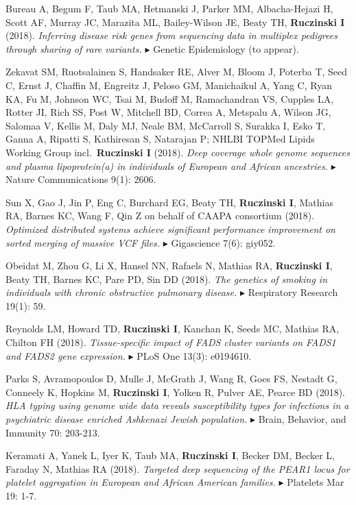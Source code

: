 \documentclass[10pt]{article}
\newcommand{\mine}{
  \addtocounter{enumi}{1}
\item[\fcolorbox{white}{grey}{\color{white} \tiny \arabic{enumi}}]
}
\newcommand{\dg}[1]{{\color{black} $\blacktriangleright$ {#1}}}
\begin{document}
\mine 
Bureau A, Begum F, Taub MA, Hetmanski J, Parker MM, Albacha-Hejazi H, Scott AF, Murray JC, Marazita ML, Bailey-Wilson JE, Beaty TH, {\bf Ruczinski I} (2018).
{\it Inferring disease risk genes from sequencing data in multiplex pedigrees through sharing of rare variants.}
\dg{Genetic Epidemiology (to appear).}
\item
Zekavat SM, Ruotsalainen S, Handsaker RE, Alver M, Bloom J, Poterba T, Seed C, Ernst J, Chaffin M, Engreitz J, Peloso GM, Manichaikul A, Yang C, Ryan KA, Fu M, Johnson WC, Tsai M, Budoff M, Ramachandran VS, Cupples LA, Rotter JI, Rich SS, Post W, Mitchell BD, Correa A, Metspalu A, Wilson JG, Salomaa V, Kellis M, Daly MJ, Neale BM, McCarroll S, Surakka I, Esko T, Ganna A, Ripatti S, Kathiresan S, Natarajan P; NHLBI TOPMed Lipids Working Group incl.~{\bf Ruczinski I} (2018).
{\it Deep coverage whole genome sequences and plasma lipoprotein(a) in individuals of European and African ancestries.}
\dg{Nature Communications 9(1): 2606.}
\item
Sun X, Gao J, Jin P, Eng C, Burchard EG, Beaty TH, {\bf Ruczinski I}, Mathias RA, Barnes KC, Wang F, Qin Z on behalf of CAAPA consortium (2018).
{\it Optimized distributed systems achieve significant performance improvement on sorted merging of massive VCF files.}
\dg{Gigascience 7(6): giy052.}
\item 
Obeidat M, Zhou G, Li X, Hansel NN, Rafaels N, Mathias RA, {\bf Ruczinski I}, Beaty TH, Barnes KC, Pare PD, Sin DD (2018).
{\it The genetics of smoking in individuals with chronic obstructive pulmonary disease.}
\dg{Respiratory Research 19(1): 59.}
\item 
Reynolds LM, Howard TD, {\bf Ruczinski I}, Kanchan K, Seeds MC, Mathias RA, Chilton FH (2018).
{\it Tissue-specific impact of FADS cluster variants on FADS1 and FADS2 gene expression.}
\dg{PLoS One 13(3): e0194610.}
\item 
Parks S, Avramopoulos D, Mulle J, McGrath J, Wang R, Goes FS, Nestadt G, Conneely K, Hopkins M, {\bf Ruczinski I}, Yolken R, Pulver AE, Pearce BD (2018).
{\it HLA typing using genome wide data reveals susceptibility types for infections in a psychiatric disease enriched Ashkenazi Jewish population.}
\dg{Brain, Behavior, and Immunity 70: 203-213.}
\item 
Keramati A, Yanek L, Iyer K, Taub MA, {\bf Ruczinski I}, Becker DM, Becker L, Faraday N, Mathias RA (2018).
{\it Targeted deep sequencing of the PEAR1 locus for platelet aggregation in European and African American families.}
\dg{Platelets Mar 19: 1-7.}
\item 
\end{document}
